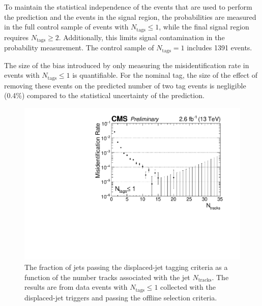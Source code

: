 To maintain the statistical independence of the events
that are used to perform the prediction and the events in the signal
region, the probabilities are measured in the full control sample of events
with $N_{\textrm{tags}}\leq 1$, while the final signal region requires
$N_{\textrm{tags}} \geq 2$. Additionally, this limits signal contamination in the probability measurement.
The control sample of $N_{\textrm{tags}}=1$ includes 1391 events. 

The size of the bias introduced by only measuring the misidentification rate in  
events with $N_\textrm{tags}\leq 1$ is quantifiable. For the nominal tag, the size
of the effect of removing these events on the predicted number of
two tag events is negligible (0.4\%)
compared to the statistical uncertainty of the prediction.

\begin{figure}
\begin{center}
\includegraphics[width=.6\textwidth]{figures/pas//ANALYSIS/76x_pu/DJET_fakeRate.pdf}
\caption{The fraction of jets passing the displaced-jet tagging criteria as a function of the number tracks associated with the jet $N_{\textrm{tracks}}$. 
The results are from data events with $N_{\textrm{tags}} \leq 1$ collected with the displaced-jet triggers and passing the offline selection criteria. \label{fig:fake_rate}}
\end{center}
\end{figure}

